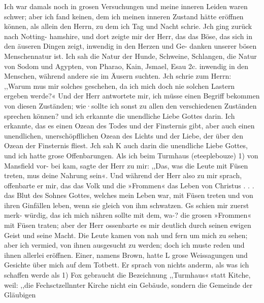 Ich war damals noch in grosen Versuchungen und meine
inneren Leiden waren schwer; aber ich fand keinen, dem ich meinen
inneren Zustand hätte eröffnen können, als allein den Herrn, zu
dem ich Tag und Nacht schrie. Jch ging zurück nach Notting-
hamshire, und dort zeigte mir der Herr, das das Böse, das sich
in den äuseren Dingen zeigt, inwendig in den Herzen und Ge-
danken unserer bösen Menschennatur ist. Ich sah die Natur der
Hunde, Schweine, Schlangen, die Natur von Sodom und Agypten,
von Pharao, Kain, Jsmael, Esau 2c. inwendig in den Menschen,
während andere sie im Äusern suchten. Jch schrie zum Herrn:
,,Warum mus mir solches geschehen, da ich mich doch nie solchen
Lastern ergeben werde?« Und der Herr antwortete mir, ich
müsse einen Begriff bekommen von diesen Zuständen; wie·sollte
ich sonst zu allen den verschiedenen Zuständen sprechen können?
und ich erkannte die unendliche Liebe Gottes darin. Ich erkannte,
das es einen Ozean des Todes und der Finsternis gibt, aber
auch einen unendlichen, unerschöpfllichen Ozean des Lichts und
der Liebe, der über den Ozean der Finsternis fliest. Jch sah K
auch darin die unendliche Liebe Gottes, und ich hatte grose
Offenbarungen.
Als ich beim Turmhaus (eteeplebouze) 1) von Mansfield vor-
bei kam, sagte der Herr zu mir: ,,Das, was die Leute mit Füsen
treten, mus deine Nahrung sein«. Und während der Herr also
zu mir sprach, offenbarte er mir, das das Volk und die »Frommen«
das Leben von Christus . . . das Blut des Sohnes Gottes, welches
mein Leben war, mit Füsen treten und von ihren Ginfällen leben,
wenn sie gleich von ihm schwatzen. Gs schien mir zuerst merk-
würdig, das ich mich nähren sollte mit dem, wa-? die grosen
»Frommen« mit Füsen traten; aber der Herr ossenbarte es mir
deutlich durch seinen ewigen Geist und seine Macht.
Die Leute kamen von nah und fern um mich zu sehen;
aber ich vermied, von ihnen ausgesucht zu werden; doch ich muste
reden und ihnen allerlei eröffnen. Einer, namens Brown, hatte
L grose Weissagungen und Gesichte über mich auf dem Totbett.
Er sprach von nichts anderm, als was ich schaffen werde als
1) Fox gebraucht die Bezeichnung ,,Turmhaus« statt Kitche, weil: ,,die
Fechsctzellnnter Kirche nicht ein Gebäude, sondern die Gemeinde der Gläubigen



